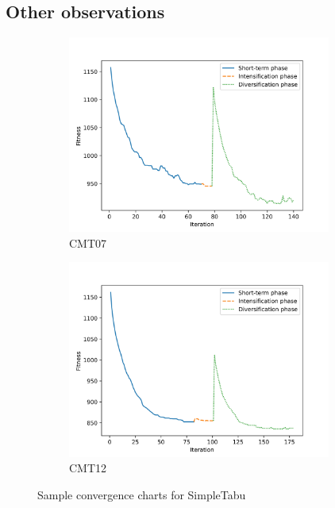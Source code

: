 \documentclass[12pt]{report}
\begin{document}
\subsection{Other observations}
\begin{figure}[ht]
    \centering
    \begin{subfigure}[b]{0.49\linewidth}
        \centering
        \includegraphics[width=0.95\textwidth]{images/converge_1.jpg}
        \caption{CMT07}
    \end{subfigure}
    \begin{subfigure}[b]{0.49\linewidth}
        \centering
        \includegraphics[width=0.95\textwidth]{images/converge_2.jpg}
        \caption{CMT12}
    \end{subfigure}
    \caption{Sample convergence charts for SimpleTabu}
	\label{fig:converge}
\end{figure}
\end{document}
